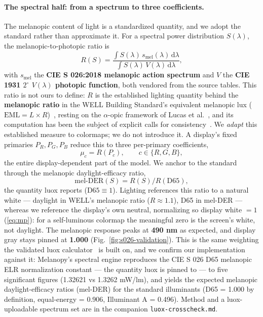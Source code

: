 \documentclass[10pt,a4paper,twocolumn]{article}
\begin{document}
\paragraph{The spectral half: from a spectrum to three coefficients.}
The melanopic content of light is a standardized quantity, and we adopt the standard rather than approximate it.
For a spectral power distribution $S(\lambda)$, the melanopic-to-photopic ratio is
\begin{equation}
  R(S) = \frac{\int S(\lambda)\,s_{\mathrm{mel}}(\lambda)\,\mathrm{d}\lambda}
              {\int S(\lambda)\,V(\lambda)\,\mathrm{d}\lambda},
  \label{eq:R}
\end{equation}
with $s_{\mathrm{mel}}$ the \textbf{CIE S 026:2018 melanopic action spectrum} and $V$ the \textbf{CIE 1931 $2^{\circ}$ $V(\lambda)$ photopic function}, both vendored from the source tables.
This ratio is not ours to define: $R$ is the established lighting quantity behind the \textbf{melanopic ratio} in the WELL Building Standard's equivalent melanopic lux ($\mathrm{EML}=L\times R$)~\cite{iwbi_well_v2}, resting on the $\alpha$-opic framework of Lucas et al.~\cite{lucas2014melanopsin}, and its computation has been the subject of explicit calls for consistency~\cite{miller2020mp}.
We \emph{adapt} this established measure to colormaps; we do not introduce it.
A display's fixed primaries $P_R, P_G, P_B$ reduce this to three per-primary coefficients,
\begin{equation}
  \mu_c = R(P_c), \qquad c\in\{R,G,B\},
  \label{eq:mu}
\end{equation}
the entire display-dependent part of the model.
We anchor to the standard through the melanopic daylight-efficacy ratio,
\begin{equation}
  \mathrm{mel\text{-}DER}(S) = R(S)/R(\mathrm{D65}),
  \label{eq:melder}
\end{equation}
the quantity luox reports ($\mathrm{D65}\equiv 1$).
Lighting references this ratio to a natural white --- daylight in WELL's melanopic ratio ($R\approx 1.1$), D65 in mel-DER --- whereas we reference the display's own neutral, normalizing so display white $=1$ (\eqref{eq:mp}): for a self-luminous colormap the meaningful zero is the screen's white, not daylight.
The melanopic response peaks at \textbf{490 nm} as expected, and display gray stays pinned at \textbf{1.000} (Fig.~\ref{fig:s026-validation}).
This is the same weighting the validated luox calculator~\cite{spitschan2021luox} is built on, and we confirm our implementation against it: Melanopy's spectral engine reproduces the CIE S 026 D65 melanopic ELR normalization constant --- the quantity luox is pinned to --- to five significant figures (1.32621 vs 1.3262 mW/lm), and yields the expected melanopic daylight-efficacy ratios (mel-DER) for the standard illuminants (D65 = 1.000 by definition, equal-energy = 0.906, Illuminant A = 0.496).
Method and a luox-uploadable spectrum set are in the companion \texttt{luox-crosscheck.md}.
\end{document}

